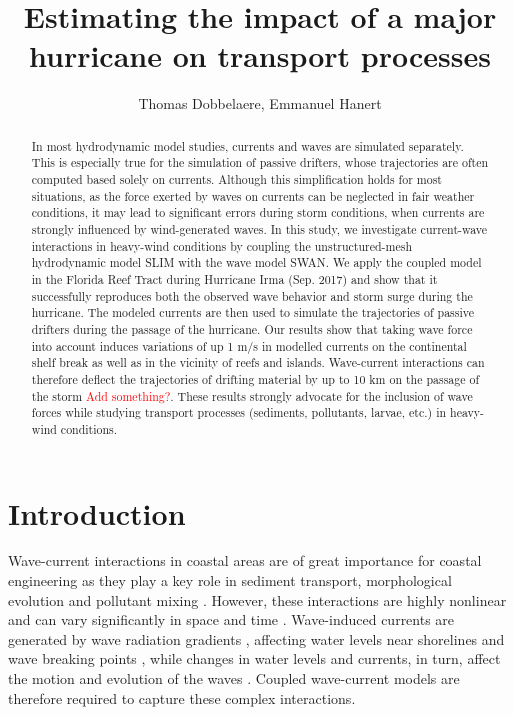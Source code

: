 \documentclass[11pt,a4paper]{article}
\title{Estimating the impact of a major hurricane on transport processes}
\author{Thomas Dobbelaere, Emmanuel Hanert}
\begin{document}
\maketitle
\begin{abstract}
In most hydrodynamic model studies, currents and waves are simulated separately. This is especially true for the simulation of passive drifters, whose trajectories are often computed based solely on currents. Although this simplification holds for most situations, as the force exerted by waves on currents can be neglected in fair weather conditions, it may lead to significant errors during storm conditions, when currents are strongly influenced by wind-generated waves. In this study, we investigate current-wave interactions in heavy-wind conditions by coupling the unstructured-mesh hydrodynamic model SLIM with the wave model SWAN. We apply the coupled model in the Florida Reef Tract during Hurricane Irma (Sep. 2017) and show that it successfully reproduces both the observed wave behavior and storm surge during the hurricane. The modeled currents are then used to simulate the trajectories of passive drifters during the passage of the hurricane. Our results show that taking wave force into account induces variations of up 1 m/s in modelled currents on the continental shelf break as well as in the vicinity of reefs and islands. Wave-current interactions can therefore deflect the trajectories of drifting material by up to 10 km on the passage of the storm \textcolor{red}{Add something?}. These results strongly advocate for the inclusion of wave forces while studying transport processes (sediments, pollutants, larvae, etc.) in heavy-wind conditions. 

\end{abstract}

\section{Introduction}

Wave-current interactions in coastal areas are of great importance for coastal engineering as they play a key role in sediment transport, morphological evolution and pollutant mixing \citep{bever2013simulating, li1998three}. However, these interactions are highly nonlinear and can vary significantly in space and time \citep{wu2011fvcom}. Wave-induced currents are generated by wave radiation gradients \citep{longuet1970longshore}, affecting water levels near shorelines and wave breaking points \citep{longuet1964radiation}, while changes in water levels and currents, in turn, affect the motion and evolution of the waves \citep{sikiric2013coupling}. Coupled wave-current models are therefore required to capture these complex interactions.
\end{document}
